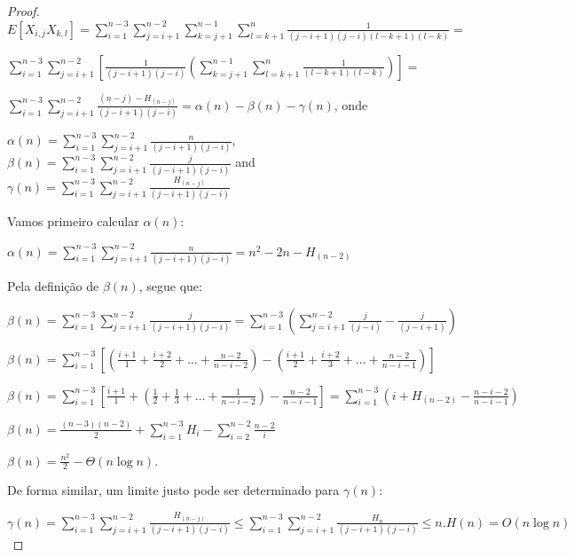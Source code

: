 \documentclass[12pt]{article}
\begin{document}
\begin{proof}
$E[X_{i,j} X_{k,l}] = \sum\limits_{i=1}^{n-3} \sum\limits_{j=i+1}^{n-2}
\sum\limits_{k=j+1}^{n-1} \sum\limits_{l=k+1}^{n} \frac{1}{(j-i+1)(j-i)(l-k+1)(l-k)} = $

$\sum\limits_{i=1}^{n-3} \sum\limits_{j=i+1}^{n-2}  \left[ \frac{1}{(j-i+1)(j-i)}
\left( \sum\limits_{k=j+1}^{n-1} \sum\limits_{l=k+1}^{n} \frac{1}{(l-k+1)(l-k)} \right) \right] =  $

$\sum\limits_{i=1}^{n-3} \sum\limits_{j=i+1}^{n-2} \frac{(n - j) - H_{(n - j)}} {(j-i+1)(j-i)} 
= \alpha(n) - \beta(n) - \gamma(n)$, onde

$\alpha(n) = \sum\limits_{i=1}^{n-3} \sum\limits_{j=i+1}^{n-2} \frac{n} {(j-i+1)(j-i)}$,
$\beta(n) = \sum\limits_{i=1}^{n-3} \sum\limits_{j=i+1}^{n-2} \frac{j} {(j-i+1)(j-i)}$ and 
$\gamma(n) =  \sum\limits_{i=1}^{n-3} \sum\limits_{j=i+1}^{n-2} \frac{H_{(n - j)}} {(j-i+1)(j-i)}$

Vamos primeiro calcular $\alpha(n)$:

$\alpha(n) = \sum\limits_{i=1}^{n-3} \sum\limits_{j=i+1}^{n-2} \frac{n} {(j-i+1)(j-i)}
= n^2 - 2n - H_{(n-2)}$

Pela definição de $\beta(n)$, segue que:

$\beta(n) = \sum\limits_{i=1}^{n-3} \sum\limits_{j=i+1}^{n-2} \frac{j} {(j-i+1)(j-i)}
= \sum\limits_{i=1}^{n-3} \left( \sum\limits_{j=i+1}^{n-2} \frac{j}{(j-i)} - \frac{j} {(j-i+1)} \right)$

$\beta(n) = \sum\limits_{i=1}^{n-3} \left[ \left( \frac{i+1}{1} +  \frac{i+2}{2} + \ldots + \frac{n-2}{n-i-2} \right)
- \left( \frac{i+1}{2} +  \frac{i+2}{3} + \ldots + \frac{n-2}{n-i-1} \right) \right]$

$\beta(n) = \sum\limits_{i=1}^{n-3} \left[
\frac{i+1}{1}  + \left( \frac{1}{2} +  \frac{1}{3} + \ldots + \frac{1}{n-i-2} \right)
- \frac{n-2}{n-i-1} \right]
= \sum\limits_{i=1}^{n-3} \left( i + H_{(n-2)} - \frac{n-i-2}{n-i-1} \right)$

$\beta(n) = \frac{(n-3)(n-2)}{2} + \sum\limits_{i=1}^{n-3} H_{i} - \sum\limits_{i=2}^{n-2} \frac{n-2}{i}$

$\beta(n) = \frac{n^2}{2} - \Theta(n \log n)$.

De forma similar, um limite justo pode ser determinado para $\gamma(n)$:

$\gamma(n) =  \sum\limits_{i=1}^{n-3} \sum\limits_{j=i+1}^{n-2} \frac{H_{(n - j)}} {(j-i+1)(j-i)}
\leq  \sum\limits_{i=1}^{n-3} \sum\limits_{j=i+1}^{n-2} \frac{H_{n}} {(j-i+1)(j-i)}
\leq  n . H(n) = O(n \log n) $


\end{proof}
\end{document}

